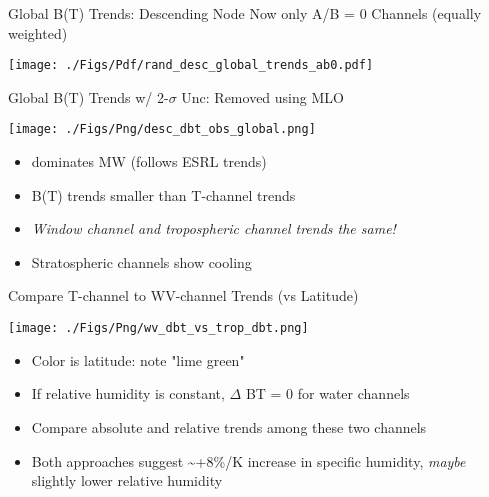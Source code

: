 \documentclass[10pt,t]{beamer}
\begin{document}
\begin{frame}[label={sec:org082db17}]{Global B(T) Trends: Descending Node}
\vspace{-0.1in}
Now only A/B = 0 Channels (equally weighted)

\begin{center}
\texttt{[image: ./Figs/Pdf/rand\_desc\_global\_trends\_ab0.pdf]}
\end{center}
\end{frame}

\begin{frame}[label={sec:org081560d}]{Global B(T) Trends w/ 2-\(\sigma\) Unc: \cd Removed using MLO}
\vspace{-0.1in}

\begin{center}
\texttt{[image: ./Figs/Png/desc\_dbt\_obs\_global.png]}
\end{center}

\vspace{-0.12in}
\begin{itemize}
\item \small \methane dominates MW (follows ESRL trends)
\item \small \water B(T) trends smaller than T-channel trends
\item \small \emph{Window channel and tropospheric channel trends the same!}
\item \small Stratospheric channels show cooling
\end{itemize}
\end{frame}

\begin{frame}[label={sec:orgca7e964}]{Compare T-channel to WV-channel Trends (vs Latitude)}
\vspace{-0.15in}

\begin{center}
\texttt{[image: ./Figs/Png/wv\_dbt\_vs\_trop\_dbt.png]}
\end{center}

\vspace{-0.12in}
\begin{itemize}
\item \small Color is latitude: note "lime green"
\item \small If relative humidity is constant, \(\Delta\) BT = 0 for water channels
\item \small Compare absolute and relative trends among these two channels
\item \small Both approaches suggest \textasciitilde{}+8\%/K increase in specific humidity, \emph{maybe} slightly lower relative humidity
\end{itemize}
\end{frame}
\end{document}
